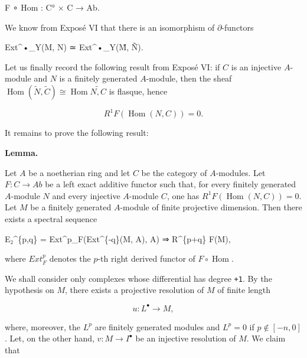 \documentclass[
  11pt,
  a4paper,
]{book}
\newenvironment{Shaded}{}{}
\newcommand{\NormalTok}[1]{#1}
\begin{document}
\begin{Shaded}
\begin{Highlighting}[]
\NormalTok{F ∘ Hom : C° × C → Ab.}
\end{Highlighting}
\end{Shaded}

We know from Exposé VI that there is an isomorphism of
\(\partial\)-functors

\begin{Shaded}
\begin{Highlighting}[]
\NormalTok{Ext\^{}•\_Y(M, N) ≃ Ext\^{}•\_Y(M̃, Ñ).}
\end{Highlighting}
\end{Shaded}

Let us finally record the following result from Exposé VI: if \(C\) is
an injective \(A\)-module and \(N\) is a finitely generated
\(A\)-module, then the sheaf
\(\operatorname{Hom}(\tilde{N}, \tilde{C}) \cong \operatorname{Hom}\tilde{N, C}\)
is flasque, hence

\[ R^{1} F(\operatorname{Hom}(N, C)) = 0. \]

It remains to prove the following result:

\textbf{Lemma.}

Let \(A\) be a noetherian ring and let \(C\) be the category of
\(A\)-modules. Let \(F : C \to Ab\) be a left exact additive functor
such that, for every finitely generated \(A\)-module \(N\) and every
injective \(A\)-module \(C\), one has \(R^{1}
F(\operatorname{Hom}(N, C)) = 0\). Let \(M\) be a finitely generated
\(A\)-module of finite projective dimension. Then there exists a
spectral sequence

\begin{Shaded}
\begin{Highlighting}[]
\NormalTok{E₂\^{}\{p,q\} = Ext\^{}p\_F(Ext\^{}\{{-}q\}(M, A), A) ⇒ R\^{}\{p+q\} F(M),}
\end{Highlighting}
\end{Shaded}

where \(Ext^{p}_{F}\) denotes the \(p\)-th right derived functor of
\(F \circ \operatorname{Hom}\).

We shall consider only complexes whose differential has degree
\texttt{+1}. By the hypothesis on \(M\), there exists a projective
resolution of \(M\) of finite length

\[ u : L^{\bullet} \to M, \]

where, moreover, the \(L^{p}\) are finitely generated modules and
\(L^{p} = 0\) if \(p \notin [-n, 0]\). Let, on the other hand,
\(v : M \to I^{\bullet}\) be an injective resolution of \(M\). We claim
that
\end{document}
